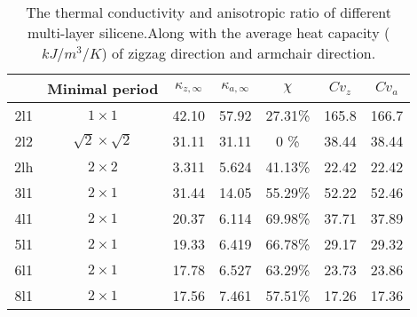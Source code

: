 \documentclass[%
 reprint,
 amsmath,amssymb,
 aps,
 prb,
]{revtex4-1}
\begin{document}
\begin{table*}
  \caption{\label{tab:table1}
    The thermal conductivity and anisotropic ratio of different multi-layer silicene.Along with the average heat capacity ($kJ/m^3/K$) of zigzag direction and armchair direction.}
  \begin{ruledtabular}
    \begin{tabular}{ccccccc}
          & Minimal period
          & $\kappa_{z,\infty}$
          & $\kappa_{a,\infty}$
          & $\chi$
          & $Cv_{z}$
          & $Cv_{a}$                                                           \\
      \hline
      2l1 & $1 \times 1$             & 42.10 & 57.92 & 27.31\% & 165.8 & 166.7 \\
      2l2 & $\sqrt{2}\times\sqrt{2}$ & 31.11 & 31.11 & 0    \% & 38.44 & 38.44 \\
      2lh & $2 \times 2$             & 3.311 & 5.624 & 41.13\% & 22.42 & 22.42 \\
      3l1 & $2 \times 1$             & 31.44 & 14.05 & 55.29\% & 52.22 & 52.46 \\
      4l1 & $2 \times 1$             & 20.37 & 6.114 & 69.98\% & 37.71 & 37.89 \\
      5l1 & $2 \times 1$             & 19.33 & 6.419 & 66.78\% & 29.17 & 29.32 \\
      6l1 & $2 \times 1$             & 17.78 & 6.527 & 63.29\% & 23.73 & 23.86 \\
      8l1 & $2 \times 1$             & 17.56 & 7.461 & 57.51\% & 17.26 & 17.36 \\
    \end{tabular}
  \end{ruledtabular}
\end{table*}
\end{document}

